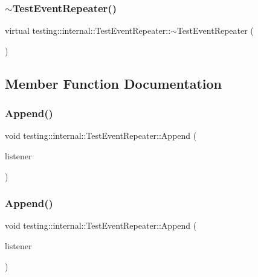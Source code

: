 \subsubsection{\texorpdfstring{$\sim$TestEventRepeater()}{~TestEventRepeater()}\hspace{0.1cm}{\footnotesize\ttfamily [3/3]}}
{\footnotesize\ttfamily virtual testing\+::internal\+::\+Test\+Event\+Repeater\+::$\sim$\+Test\+Event\+Repeater (\begin{DoxyParamCaption}{ }\end{DoxyParamCaption})\hspace{0.3cm}{\ttfamily [virtual]}}



\subsection{Member Function Documentation}
\mbox{\label{classtesting_1_1internal_1_1_test_event_repeater_ad154ce021881721a5c46994316b14cb1}} 
\subsubsection{\texorpdfstring{Append()}{Append()}\hspace{0.1cm}{\footnotesize\ttfamily [1/3]}}
{\footnotesize\ttfamily void testing\+::internal\+::\+Test\+Event\+Repeater\+::\+Append (\begin{DoxyParamCaption}\item[{\mbox{\hyperlink{classtesting_1_1_test_event_listener}{Test\+Event\+Listener}} $\ast$}]{listener }\end{DoxyParamCaption})}

\mbox{\label{classtesting_1_1internal_1_1_test_event_repeater_ad154ce021881721a5c46994316b14cb1}} 
\subsubsection{\texorpdfstring{Append()}{Append()}\hspace{0.1cm}{\footnotesize\ttfamily [2/3]}}
{\footnotesize\ttfamily void testing\+::internal\+::\+Test\+Event\+Repeater\+::\+Append (\begin{DoxyParamCaption}\item[{\mbox{\hyperlink{classtesting_1_1_test_event_listener}{Test\+Event\+Listener}} $\ast$}]{listener }\end{DoxyParamCaption})}

